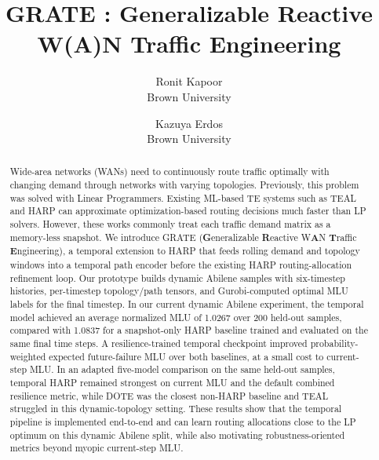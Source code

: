 \documentclass[letterpaper,twocolumn,10pt]{article}
\begin{document}
\date{}

\title{\Large \bf GRATE : Generalizable Reactive W(A)N Traffic Engineering }

\author{
{\rm Ronit Kapoor}\\
Brown University
\and
{\rm Kazuya Erdos}\\
Brown University
}

\maketitle

\thispagestyle{empty}


\begin{abstract}
Wide-area networks (WANs) need to continuously route traffic optimally with changing demand through networks with varying topologies. Previously, this problem was solved with Linear Programmers. Existing ML-based TE systems such as TEAL and HARP can approximate optimization-based routing decisions much faster than LP solvers. However, these works commonly treat each traffic demand matrix as a memory-less snapshot. We introduce GRATE (\textbf{G}eneralizable \textbf{R}eactive W\textbf{A}N \textbf{T}raffic \textbf{E}ngineering), a temporal extension to HARP that feeds rolling demand and topology windows into a temporal path encoder before the existing HARP routing-allocation refinement loop. Our prototype builds dynamic Abilene samples with six-timestep histories, per-timestep topology/path tensors, and Gurobi-computed optimal MLU labels for the final timestep. In our current dynamic Abilene experiment, the temporal model achieved an average normalized MLU of 1.0267 over 200 held-out samples, compared with 1.0837 for a snapshot-only HARP baseline trained and evaluated on the same final time steps. A resilience-trained temporal checkpoint improved probability-weighted expected future-failure MLU over both baselines, at a small cost to current-step MLU. In an adapted five-model comparison on the same held-out samples, temporal HARP remained strongest on current MLU and the default combined resilience metric, while DOTE was the closest non-HARP baseline and TEAL struggled in this dynamic-topology setting. These results show that the temporal pipeline is implemented end-to-end and can learn routing allocations close to the LP optimum on this dynamic Abilene split, while also motivating robustness-oriented metrics beyond myopic current-step MLU.
\end{abstract}
\end{document}
